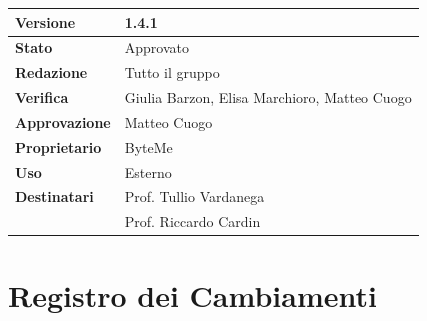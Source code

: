 \documentclass[11pt,a4paper]{article}
\begin{document}
\begin{titlepage}
    \begin{table}[H]
        \centering
        \begin{tabular}{|l|p{5cm}|}
            \hline
            \textbf{Versione} & 1.4.1 \\
            \hline
            \textbf{Stato} & Approvato \\
            \hline
            \textbf{Redazione} & Tutto il gruppo \\
            \hline
            \textbf{Verifica} & Giulia Barzon, Elisa Marchioro, Matteo Cuogo \\
            \hline
            \textbf{Approvazione} & Matteo Cuogo\\
            \hline
            \textbf{Proprietario} & ByteMe \\
            \hline
            \textbf{Uso} & Esterno \\
            \hline
            \textbf{Destinatari} & Prof. Tullio Vardanega \\ & Prof. Riccardo Cardin \\
            \hline
        \end{tabular}
    \end{table}
    
    \vfill
\end{titlepage}

\thispagestyle{empty}
\section*{Registro dei Cambiamenti}
\end{document}
